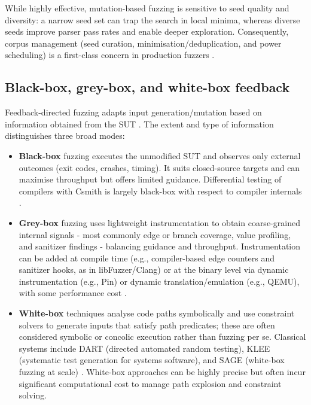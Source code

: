 While highly effective, mutation-based fuzzing is sensitive to seed quality and diversity: a narrow seed set can trap the search in local minima, whereas diverse seeds improve parser pass rates and enable deeper exploration. Consequently, corpus management (seed curation, minimisation/deduplication, and power scheduling) is a first-class concern in production fuzzers \cite{bhme_2016_coveragebased,serebryany_2016_libfuzzer}.

\subsection{Black-box, grey-box, and white-box feedback}

Feedback-directed fuzzing adapts input generation/mutation based on information obtained from the SUT \cite{bhme_2016_coveragebased}. The extent and type of information distinguishes three broad modes:

\begin{itemize}
    \item \textbf{Black-box} fuzzing executes the unmodified SUT and observes only external outcomes (exit codes, crashes, timing). It suits closed-source targets and can maximise throughput but offers limited guidance. Differential testing of compilers with Csmith is largely black-box with respect to compiler internals \cite{yang_2011_finding}.

    \item \textbf{Grey-box} fuzzing uses lightweight instrumentation to obtain coarse-grained internal signals - most commonly edge or branch coverage, value profiling, and sanitizer findings - balancing guidance and throughput. Instrumentation can be added at compile time (e.g., compiler-based edge counters and sanitizer hooks, as in libFuzzer/Clang) or at the binary level via dynamic instrumentation (e.g., Pin) or dynamic translation/emulation (e.g., QEMU), with some performance cost \cite{serebryany_2016_libfuzzer,luk_2005_pin,bellard_2005_qemu}.

    \item \textbf{White-box} techniques analyse code paths symbolically and use constraint solvers to generate inputs that satisfy path predicates; these are often considered symbolic or concolic execution rather than fuzzing per se. Classical systems include DART (directed automated random testing), KLEE (systematic test generation for systems software), and SAGE (white-box fuzzing at scale) \cite{godefroid_2005_dart,cadar_2008_klee,godefroid_2012_sage}. White-box approaches can be highly precise but often incur significant computational cost to manage path explosion and constraint solving.
\end{itemize}

